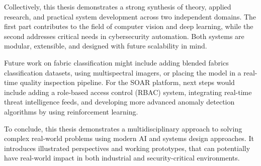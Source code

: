 Collectively, this thesis demonstrates a strong synthesis of theory, applied research, and practical system development across two independent domains. The first part contributes to the field of computer vision and deep learning, while the second addresses critical needs in cybersecurity automation. Both systems are modular, extensible, and designed with future scalability in mind.

Future work on fabric classification might include adding blended fabrics classification datasets, using multispectral imagers, or placing the model in a real-time quality inspection pipeline. For the SOAR platform, next steps would include adding a role-based access control (RBAC) system, integrating real-time threat intelligence feeds, and developing more advanced anomaly detection algorithms by using reinforcement learning.

To conclude, this thesis demonstrates a multidisciplinary approach to solving complex real-world problems using modern AI and systems design approaches. It introduces illustrated perspectives and working prototypes, that can potentially have real-world impact in both industrial and security-critical environments.